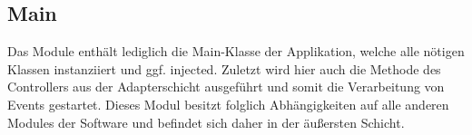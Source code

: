 \subsection{Main}
Das Module  enthält lediglich die Main-Klasse der Applikation, welche alle nötigen Klassen instanziiert und ggf. injected. Zuletzt wird hier auch die Methode  des Controllers aus der Adapterschicht ausgeführt und somit die Verarbeitung von Events gestartet. Dieses Modul besitzt folglich Abhängigkeiten auf alle anderen Modules der Software und befindet sich daher in der äußersten Schicht.
